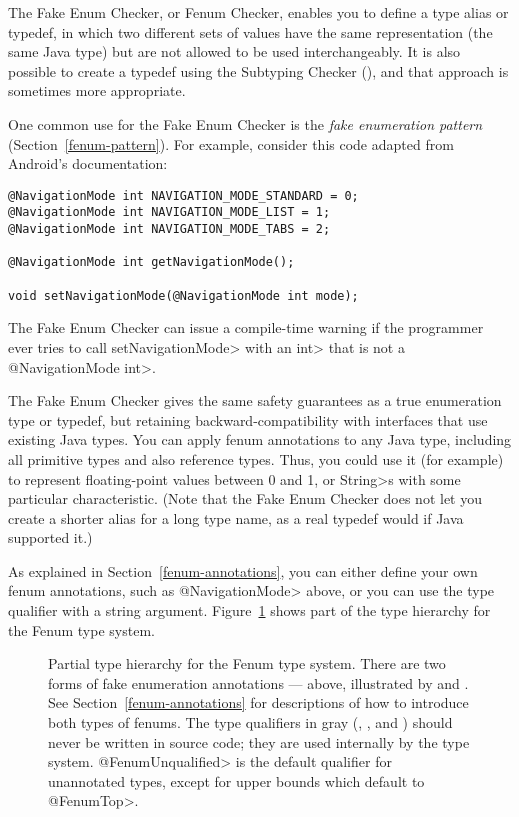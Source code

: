 \htmlhr
{}

The Fake Enum Checker, or Fenum Checker, enables you to define a type alias
or typedef, in which two different sets of values have the same
representation (the same Java type) but are not allowed to be used
interchangeably.  It is also possible to create a typedef using the
Subtyping Checker (), and that approach
is sometimes more appropriate.

One common use for the Fake Enum Checker is the
\emph{fake enumeration pattern} (Section~\ref{fenum-pattern}).  For
example, consider this code adapted from Android's
\href{https://developer.android.com/reference/android/support/annotation/IntDef}{}
documentation:

\begin{Verbatim}
@NavigationMode int NAVIGATION_MODE_STANDARD = 0;
@NavigationMode int NAVIGATION_MODE_LIST = 1;
@NavigationMode int NAVIGATION_MODE_TABS = 2;

@NavigationMode int getNavigationMode();

void setNavigationMode(@NavigationMode int mode);
\end{Verbatim}

The Fake Enum Checker can issue a compile-time warning if the programmer
ever tries to call \<setNavigationMode> with an \<int> that is not a
\<@NavigationMode int>.

The Fake Enum Checker gives the same safety guarantees as a true enumeration
type or typedef, but retaining backward-compatibility with interfaces that
use existing Java types.  You can apply fenum annotations to any Java type,
including all primitive types and also reference types.  Thus, you could
use it (for example) to represent floating-point values between 0 and 1, or
\<String>s with some particular characteristic.
(Note that the Fake Enum Checker does not let you create a shorter alias
for a long type name, as a real typedef would if Java supported it.)

As explained in Section~\ref{fenum-annotations}, you can either define your
own fenum annotations, such as \<@NavigationMode> above, or you can use the
 type qualifier with a string argument.
Figure~\ref{fig-fenum-hierarchy} shows part of the type hierarchy for the
Fenum type system.

\begin{figure}
\caption{Partial type hierarchy for the Fenum type system.
There are two forms of fake enumeration annotations --- above, illustrated
by  and .
See Section~\ref{fenum-annotations} for descriptions of how to
introduce both types of fenums. The type qualifiers in gray
(, , and )
should never be written in
source code; they are used internally by the type system.
\<@FenumUnqualified> is the default qualifier for unannotated types, except
for upper bounds which default to \<@FenumTop>.
}
\label{fig-fenum-hierarchy}
\end{figure}


